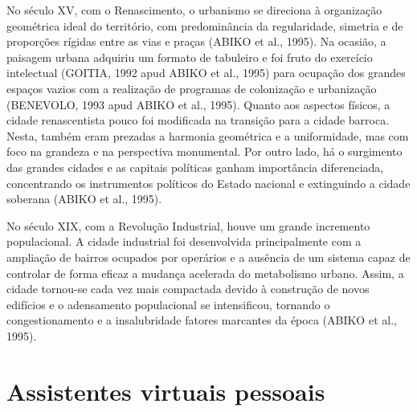 No século XV, com o Renascimento, o urbanismo se direciona à organização geométrica ideal do território, com predominância da regularidade, simetria e de proporções rígidas entre as vias e praças (ABIKO et al., 1995). Na ocasião, a paisagem urbana adquiriu um formato de tabuleiro e foi fruto do exercício intelectual (GOITIA, 1992 apud ABIKO et al., 1995) para ocupação dos grandes espaços vazios com a realização de programas de colonização e urbanização (BENEVOLO, 1993 apud ABIKO et al., 1995). Quanto aos aspectos físicos, a cidade renascentista pouco foi modificada na transição para a cidade barroca. Nesta, também eram prezadas a harmonia geométrica e a uniformidade, mas com foco na grandeza e na perspectiva monumental. Por outro lado, há o surgimento das grandes cidades e as capitais políticas ganham importância
diferenciada, concentrando os instrumentos políticos do Estado nacional e extinguindo a cidade soberana (ABIKO et al., 1995).

No século XIX, com a Revolução Industrial, houve um grande incremento populacional. A cidade industrial foi desenvolvida principalmente com a ampliação de bairros ocupados por operários e a ausência de um sistema capaz de controlar de forma eficaz a mudança acelerada do metabolismo urbano. Assim, a cidade tornou-se cada vez mais compactada devido à construção de novos edifícios e o adensamento populacional
se intensificou, tornando o congestionamento e a insalubridade fatores marcantes da época (ABIKO et al., 1995).

\section{Assistentes virtuais pessoais} \label{s:assistentes_virtuais_pessoais}


